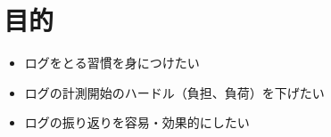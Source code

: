 \section{目的} \label{sec:purpose}

\begin{itemize}
  \item ログをとる習慣を身につけたい
  \item ログの計測開始のハードル（負担、負荷）を下げたい
  \item ログの振り返りを容易・効果的にしたい
\end{itemize}

